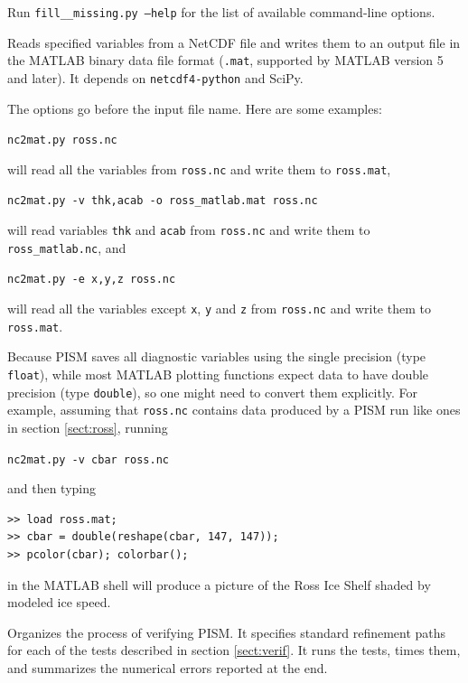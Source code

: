 \documentclass[11pt,final]{amsart}
\newcommand{\und}{\_\!\_}
\begin{document}
Run \texttt{fill\und missing.py --help} for the list of available
command-line options.


 Reads specified variables from a NetCDF file and writes them to an output file in the MATLAB binary data file format (\verb|.mat|, supported by MATLAB version 5 and later). It depends on \verb|netcdf4-python| and SciPy.

The options go before the input file name.  Here are some examples:

\verb|nc2mat.py ross.nc|

\noindent will read all the variables from \verb|ross.nc| and write them to \verb|ross.mat|,

\verb|nc2mat.py -v thk,acab -o ross_matlab.mat ross.nc|

\noindent will read variables \verb|thk| and \verb|acab| from \verb|ross.nc| and write them to \verb|ross_matlab.nc|, and

\verb|nc2mat.py -e x,y,z ross.nc|

\noindent will read all the variables except \verb|x|, \verb|y| and \verb|z| from \verb|ross.nc| and write them to \verb|ross.mat|.

Because PISM saves all diagnostic variables using the single precision (type \verb|float|), while most MATLAB plotting functions expect data to have double precision (type \verb|double|), so one might need to convert them explicitly.  For example, assuming that \verb|ross.nc| contains data produced by a PISM run like ones in section \ref{sect:ross}, running

\verb|nc2mat.py -v cbar ross.nc|

\noindent and then typing
\begin{verbatim}
>> load ross.mat;
>> cbar = double(reshape(cbar, 147, 147));
>> pcolor(cbar); colorbar();
\end{verbatim}
in the MATLAB shell will produce a picture of the Ross Ice Shelf shaded by modeled ice speed.

  Organizes the process of verifying PISM.  It specifies standard refinement paths for each of the tests described in section \ref{sect:verif}.  It runs the tests, times them, and summarizes the numerical errors reported at the end.
\end{document}
